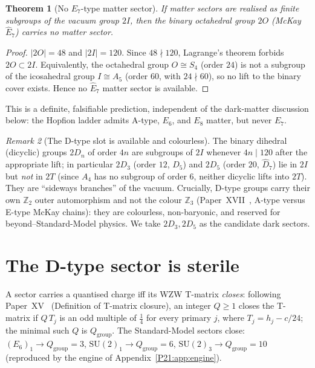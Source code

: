 \documentclass[11pt,a4paper]{article}
\newtheorem{theorem}{Theorem}[section]
\theoremstyle{definition}\newtheorem{definition}[theorem]{Definition}
\theoremstyle{remark}
\newtheorem{remark}[theorem]{Remark}
\newcommand{\SU}{\mathrm{SU}}
\newcommand{\twoI}{2I}
\newcommand{\twoT}{2T}
\newcommand{\twoO}{2O}
\newcommand{\twoD}{2D}
\newcommand{\Qgr}{Q_{\mathrm{group}}}
\newcommand{\Ztwo}{\mathbb{Z}_2}
\newcommand{\Zthree}{\mathbb{Z}_3}
\begin{document}
\begin{theorem}[No $E_7$-type matter sector]
\label{P21:thm:noE7}
If matter sectors are realised as finite subgroups of the vacuum group
$\twoI$, then the binary octahedral group $\twoO$ (McKay $\widehat{E}_7$)
carries no matter sector.
\end{theorem}
\begin{proof}
$|\twoO|=48$ and $|\twoI|=120$. Since $48\nmid120$, Lagrange's theorem
forbids $\twoO\subset\twoI$. Equivalently, the octahedral group
$O\cong S_4$ (order $24$) is not a subgroup of the icosahedral group
$I\cong A_5$ (order $60$, with $24\nmid60$), so no lift to the binary
cover exists. Hence no $\widehat{E}_7$ matter sector is available.
\end{proof}

\noindent This is a definite, falsifiable prediction, independent of the
dark-matter discussion below: the Hopfion ladder admits A-type, $E_6$,
and $E_8$ matter, but never $E_7$.

\begin{remark}[The D-type slot is available and colourless]
\label{P21:rem:dtype_slot}
The binary dihedral (dicyclic) groups $\twoD_n$ of order $4n$ are
subgroups of $\twoI$ whenever $4n\mid120$ after the appropriate lift;
in particular $\twoD_3$ (order $12$, $\widehat{D}_5$) and $\twoD_5$
(order $20$, $\widehat{D}_7$) lie in $\twoI$ but \emph{not} in $\twoT$
(since $A_4$ has no subgroup of order $6$, neither dicyclic lifts into
$\twoT$). They are ``sideways branches'' of the vacuum. Crucially,
D-type groups carry their own $\Ztwo$ outer automorphism and not the
colour $\Zthree$ (Paper~XVII~\cite{Paper17}, A-type versus E-type McKay
chains): they are colourless, non-baryonic, and
reserved for beyond--Standard-Model physics. We take $\twoD_3,\twoD_5$
as the candidate dark sectors.
\end{remark}

\section{The D-type sector is sterile}
\label{P21:sec:sterile}
A sector carries a quantised charge iff its WZW T-matrix \emph{closes}:
following Paper~XV~\cite{Paper15} (Definition of T-matrix closure), an
integer $Q\geq1$ closes the T-matrix if $Q\,T_j$ is an odd multiple of
$\tfrac14$ for every primary $j$, where $T_j=h_j-c/24$; the minimal such
$Q$ is $\Qgr$. The Standard-Model sectors close: $(E_6)_1\to\Qgr=3$,
$\SU(2)_1\to\Qgr=6$, $\SU(2)_3\to\Qgr=10$ (reproduced by the engine of
Appendix~\ref{P21:app:engine}).
\end{document}
